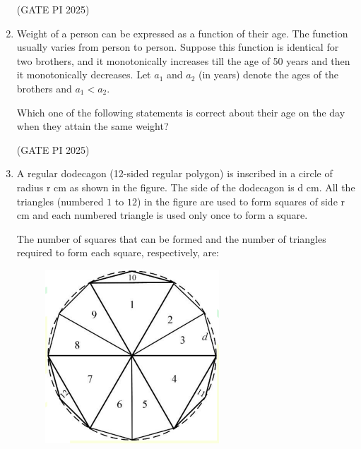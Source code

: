 \documentclass[journal,12pt,onecolumn]{IEEEtran}
\theoremstyle{remark}
\begin{document}
\begin{enumerate}
\hfill (GATE PI 2025)

\item Weight of a person can be expressed as a function of their age. The function usually varies from person to person. Suppose this function is identical for two brothers, and it monotonically increases till the age of 50 years and then it monotonically decreases. Let $a_1$ and $a_2$ (in years) denote the ages of the brothers and $a_1<a_2$.

Which one of the following statements is correct about their age on the day when they attain the same weight?

\begin{enumerate}
\end{enumerate}

\hfill (GATE PI 2025)

\item A regular dodecagon (12-sided regular polygon) is inscribed in a circle of radius r cm as shown in the figure. The side of the dodecagon is d cm. All the triangles (numbered $1$ to $12$) in the figure are used to form squares of side r cm and each numbered triangle is used only once to form a square.

The number of squares that can be formed and the number of triangles required to form each square, respectively, are:
\begin{figure}[H]
\centering
\includegraphics[width=0.3\columnwidth]{fig2.png}
\caption{}
\end{figure}

\begin{enumerate}
\end{enumerate}


\end{enumerate}
\end{document}
